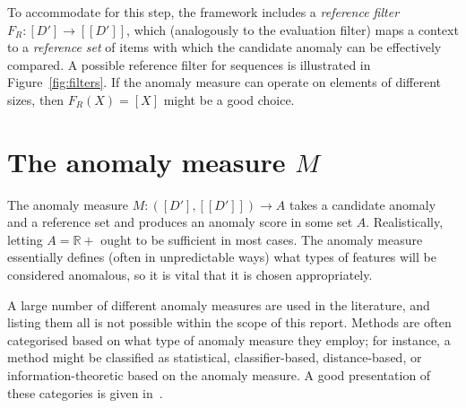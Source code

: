To accommodate for this step, the framework includes a \emph{reference filter} $F_R: [D'] \rightarrow [[D']] $, which (analogously to the evaluation filter) maps a context to a \emph{reference set} of items with which the candidate anomaly can be effectively compared. A possible reference filter for sequences is illustrated in Figure~\ref{fig:filters}. If the anomaly measure can operate on elements of different sizes, then $F_R(X) = [X]$ might be a good choice.

\section{The anomaly measure $M$}

The anomaly measure $M: ([D'], [[D']]) \rightarrow A$ takes a candidate anomaly and a reference set and produces an anomaly score in some set $A$. Realistically, letting $A = \mathbb{R}+$ ought to be sufficient in most cases. The anomaly measure essentially defines (often in unpredictable ways) what types of features will be considered anomalous, so it is vital that it is chosen appropriately.

A large number of different anomaly measures are used in the literature, and listing them all is not possible within the scope of this report. Methods are often categorised based on what type of anomaly measure they employ; for instance, a method might be classified as statistical, classifier-based, distance-based, or information-theoretic based on the anomaly measure. A good presentation of these categories is given in~\cite{chandola}.

